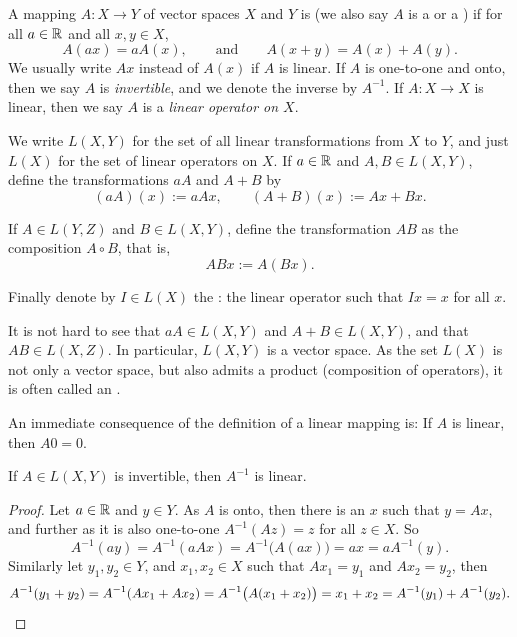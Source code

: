 \begin{defn}
A mapping $A \colon X \to Y$ of vector spaces $X$ and $Y$
is \emph{} (we also say $A$ is a
\emph{}
or a \emph{})
if for all $a \in {\mathbb{R}}$ and all $x,y \in X$,
\begin{equation*}
A(a x) = a A(x), \qquad \text{and} \qquad A(x+y) = A(x)+A(y) .
\end{equation*}
We usually write $Ax$ instead of $A(x)$ if $A$ is linear.
If $A$ is one-to-one and onto, then we say $A$ is
\emph{invertible},
and we denote the inverse by $A^{-1}$.
If $A \colon X \to X$ is linear, then we say $A$ is a
\emph{linear operator on $X$}.

We write $L(X,Y)$ for the set of all linear transformations from $X$ to
$Y$, and just $L(X)$ for the set of linear operators on $X$.
If $a \in {\mathbb{R}}$ and $A,B \in L(X,Y)$, define
the transformations $aA$ and $A+B$ by
\begin{equation*}
(aA)(x) := aAx ,
\qquad
(A+B)(x) := Ax + Bx .
\end{equation*}

If $A \in L(Y,Z)$ and $B \in L(X,Y)$, define the
transformation $AB$ as the composition $A \circ B$, that is,
\begin{equation*}
ABx := A(Bx) .
\end{equation*}

Finally denote by $I \in L(X)$ the \emph{}: 
the linear operator such that $Ix = x$ for all $x$.
\end{defn}

It is not hard to see that $aA \in L(X,Y)$
and $A+B \in L(X,Y)$, and that $AB \in L(X,Z)$.
In particular, $L(X,Y)$ is a vector space.
As the set $L(X)$ is not only a vector space, but also
admits a product (composition of operators),
it is often called an \emph{}.

An immediate consequence of the definition of a linear mapping is: If
$A$ is linear, then $A0 = 0$.

\begin{prop}
If $A \in L(X,Y)$ is invertible, then $A^{-1}$ is linear.
\end{prop}

\begin{proof}
Let $a \in {\mathbb{R}}$ and $y \in Y$.  As $A$ is onto, then there is an 
$x$ such that $y = Ax$, and further as it is also one-to-one
$A^{-1}(Az) = z$ for all $z \in X$.  So
\begin{equation*}
A^{-1}(ay)
=
A^{-1}(aAx)
=
A^{-1}\bigl(A(ax)\bigr)
= ax
= aA^{-1}(y).
\end{equation*}
Similarly let $y_1,y_2 \in Y$, and $x_1, x_2 \in X$ such that
$Ax_1 = y_1$ and 
$Ax_2 = y_2$, then
\begin{equation*}
A^{-1}(y_1+y_2)
=
A^{-1}(Ax_1+Ax_2)
=
A^{-1}\bigl(A(x_1+x_2)\bigr)
= x_1+x_2
= A^{-1}(y_1) + A^{-1}(y_2). \qedhere
\end{equation*}
\end{proof}

